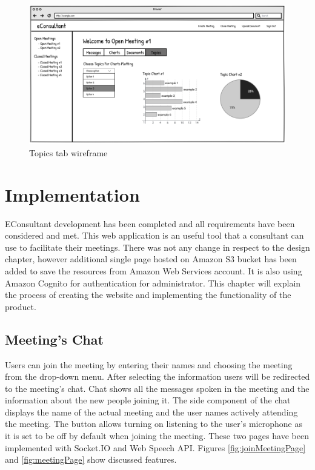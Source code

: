\documentclass{article}
\begin{document}
\begin{figure}[H]
  \centering
  \includegraphics[scale=0.57]{img/topics.png}
  \caption{Topics tab wireframe}
  \label{fig:Topics tab}
\end{figure}

\newpage

\section{Implementation}
{\large 
EConsultant development has been completed and all requirements have been considered and met. This web application is an useful tool that a consultant can use to facilitate their meetings. There was not any change in respect to the design chapter, however additional single page hosted on Amazon S3 bucket has been added to save the resources from Amazon Web Services account. It is also using Amazon Cognito for authentication for administrator. This chapter will explain the process of creating the website and implementing the functionality of the product.\par
}

\subsection{Meeting's Chat}
{\large 
Users can join the meeting by entering their names and choosing the meeting from the drop-down menu. After selecting the information users will be redirected to the meeting's chat. Chat shows all the messages spoken in the meeting and the information about the new people joining it. The side component of the chat displays the name of the actual meeting and the user names actively attending the meeting. The button allows turning on listening to the user's microphone as it is set to be off by default when joining the meeting. These two pages have been implemented with Socket.IO and Web Speech API. Figures \ref{fig:joinMeetingPage} and \ref{fig:meetingPage} show discussed features.\par
}
\end{document}
